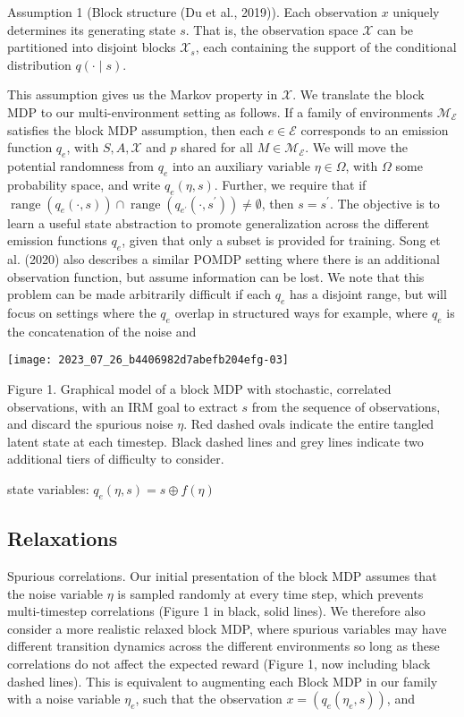 \documentclass[10pt]{article}
\begin{document}
Assumption 1 (Block structure (Du et al., 2019)). Each observation $x$ uniquely determines its generating state $s$. That is, the observation space $\mathcal{X}$ can be partitioned into disjoint blocks $\mathcal{X}_{s}$, each containing the support of the conditional distribution $q(\cdot \mid s)$.

This assumption gives us the Markov property in $\mathcal{X}$. We translate the block MDP to our multi-environment setting as follows. If a family of environments $\mathcal{M}_{\mathcal{E}}$ satisfies the block MDP assumption, then each $e \in \mathcal{E}$ corresponds to an emission function $q_{e}$, with $S, A, \mathcal{X}$ and $p$ shared for all $M \in \mathcal{M}_{\mathcal{E}}$. We will move the potential randomness from $q_{e}$ into an auxiliary variable $\eta \in \Omega$, with $\Omega$ some probability space, and write $q_{e}(\eta, s)$. Further, we require that if $\operatorname{range}\left(q_{e}(\cdot, s)\right) \cap \operatorname{range}\left(q_{e^{\prime}}\left(\cdot, s^{\prime}\right)\right) \neq \emptyset$, then $s=s^{\prime}$. The objective is to learn a useful state abstraction to promote generalization across the different emission functions $q_{e}$, given that only a subset is provided for training. Song et al. (2020) also describes a similar POMDP setting where there is an additional observation function, but assume information can be lost. We note that this problem can be made arbitrarily difficult if each $q_{e}$ has a disjoint range, but will focus on settings where the $q_{e}$ overlap in structured ways for example, where $q_{e}$ is the concatenation of the noise and

\begin{center}
\texttt{[image: 2023\_07\_26\_b4406982d7abefb204efg-03]}
\end{center}

Figure 1. Graphical model of a block MDP with stochastic, correlated observations, with an IRM goal to extract $s$ from the sequence of observations, and discard the spurious noise $\eta$. Red dashed ovals indicate the entire tangled latent state at each timestep. Black dashed lines and grey lines indicate two additional tiers of difficulty to consider.

state variables: $q_{e}(\eta, s)=s \oplus f(\eta)$

\subsection{Relaxations}
Spurious correlations. Our initial presentation of the block MDP assumes that the noise variable $\eta$ is sampled randomly at every time step, which prevents multi-timestep correlations (Figure 1 in black, solid lines). We therefore also consider a more realistic relaxed block MDP, where spurious variables may have different transition dynamics across the different environments so long as these correlations do not affect the expected reward (Figure 1, now including black dashed lines). This is equivalent to augmenting each Block MDP in our family with a noise variable $\eta_{e}$, such that the observation $x=\left(q_{e}\left(\eta_{e}, s\right)\right)$, and
\end{document}
